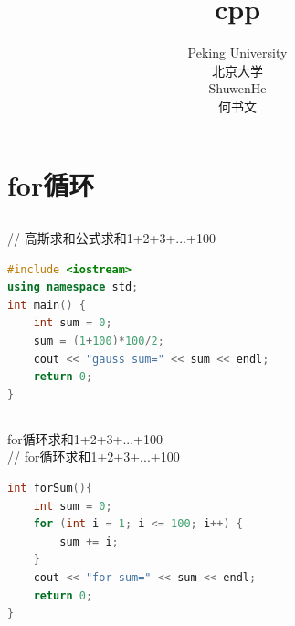 \documentclass[12pt,twiside,a4paper]{ctexbook}
\numberwithin{chapter}{part}
\begin{document}

\author
{
Peking University\\
北京大学\\
ShuwenHe\\
何书文
}

\title{cpp}
\maketitle
\tableofcontents
\pagestyle{fancy}


\chapter{for循环}
\section{}
// 高斯求和公式求和1+2+3+...+100
\begin{lstlisting}[language=C++]
#include <iostream>
using namespace std;
int main() {
    int sum = 0;
    sum = (1+100)*100/2;
    cout << "gauss sum=" << sum << endl;
    return 0;
}
\end{lstlisting}

\section{}
for循环求和1+2+3+...+100\\
// for循环求和1+2+3+...+100
\begin{lstlisting}[language=C++]
int forSum(){
    int sum = 0;
    for (int i = 1; i <= 100; i++) {
        sum += i;
    }
    cout << "for sum=" << sum << endl;
    return 0;
}
\end{lstlisting}

\clearpage
\end{document}
